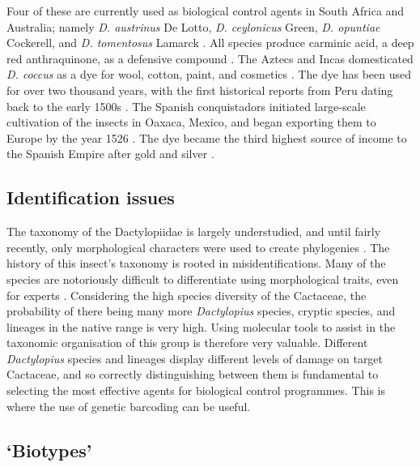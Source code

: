 \noindent  Four of these are currently used as biological control agents in South Africa and Australia; namely \textit{D. austrinus} De Lotto, \textit{D. ceylonicus} Green, \textit{D. opuntiae} Cockerell, and \textit{D. tomentosus} Lamarck \citep{DeLotto1974, Perez-Guerra1992, managingOpuntioid2017}. 
All species produce carminic acid, a deep red anthraquinone, as a defensive compound \citep{Eisner1980, Perez-Guerra1992}. The Aztecs and Incas domesticated \textit{D. coccus} as a dye for wool, cotton, paint, and cosmetics \citep{Nobel2002CactiUses}. The dye has been used for over two thousand years, with the first historical reports from Peru dating back to the early 1500s \citep{Nobel2002CactiUses}. The Spanish conquistadors initiated large-scale cultivation of the insects in Oaxaca, Mexico, and began exporting them to Europe by the year 1526 \citep{Meyer2000}. The dye became the third highest source of income to the Spanish Empire after gold and silver \citep{Humboldt1966,Chavez-Moreno2009TheDistribution}.

\subsection{Identification issues}
The taxonomy of the Dactylopiidae is largely understudied, and until fairly recently, only morphological characters were used to create phylogenies \citep{Ramirez-Puebla2010MolecularBacteria}. The history of this insect's taxonomy is rooted in misidentifications. Many of the species are notoriously difficult to differentiate using morphological traits, even for experts \citep{Mann1969Cactus-feedingMites, Perez-Guerra1992, Gullan1997, Portillo2006AENEMIES}. Considering the high species diversity of the Cactaceae, the probability of there being many more \textit{Dactylopius} species, cryptic species, and lineages in the native range is very high. Using molecular tools to assist in the taxonomic organisation of this group is therefore very valuable. Different \textit{Dactylopius} species and lineages display different levels of damage on target Cactaceae, and so correctly distinguishing between them is fundamental to selecting the most effective agents for biological control programmes. This is where the use of genetic barcoding can be useful. 

\subsection{`Biotypes'}
\label{sec:biotypes}

